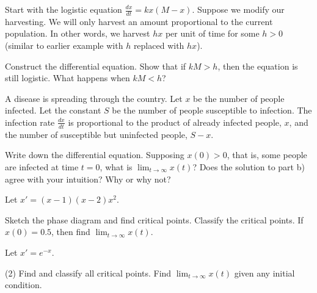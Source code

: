 \begin{exercise}
Start with the logistic equation
$\frac{dx}{dt} = kx(M-x)$.
Suppose we modify our harvesting.  We will only harvest
an amount proportional to the current population.  In other words, we harvest $hx$
per unit of time
for some $h > 0$ (similar to earlier example with $h$ replaced with $hx$).
\begin{tasks}
\task Construct the differential equation.
\task Show that if $kM > h$, then
the equation is still logistic.
\task What happens when $kM < h$?
\end{tasks}
\end{exercise}

\begin{exercise}
A disease is spreading through the country.  Let $x$ be the number of people
infected.  Let the constant $S$ be the number of people susceptible to
infection.  The infection rate $\frac{dx}{dt}$ is proportional to the product
of already infected people, $x$, and the number of susceptible but
uninfected people, $S-x$.
\begin{tasks}
\task Write down the differential equation.
\task Supposing $x(0) > 0$, that is, some people are infected at time $t=0$,
what is
$\displaystyle \lim_{t\to\infty} x(t)$?
\task Does the solution to part b) agree with your intuition?  Why or why not?
\end{tasks}
\end{exercise}


\setcounter{exercise}{100}

\begin{exercise}
\pagebreak[2]
Let $x'=(x-1)(x-2)x^2$.
\begin{tasks}
\task Sketch the phase diagram and find critical
points.
\task Classify the critical points.
\task If $x(0)=0.5$, then find $\displaystyle \lim_{t\to\infty} x(t)$.
\end{tasks}
\end{exercise}

\begin{exercise}
Let $x'=e^{-x}$.
\begin{tasks}(2)
\task Find and classify all critical points.
\task Find $\displaystyle \lim_{t\to\infty} x(t)$ given any
initial condition.
\end{tasks}
\end{exercise}

